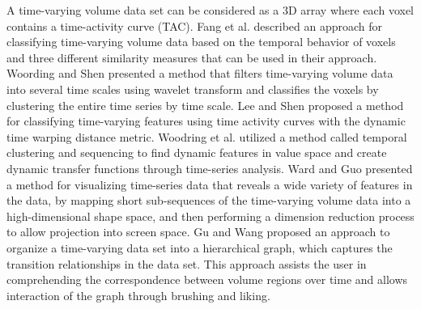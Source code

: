 A time-varying volume data set can be considered as a 3D array where each voxel contains a time-activity curve (TAC). Fang et al. \cite{fang_visualization_2007} described an approach for classifying time-varying volume data based on the temporal behavior of voxels and three different similarity measures that can be used in their approach.
Woording and Shen \cite{woodring_multiscale_2009} presented a method that filters time-varying volume data into several time scales using wavelet transform and classifies the voxels by clustering the entire time series by time scale.
Lee and Shen \cite{lee_visualizing_2009} proposed a method for classifying time-varying features using time activity curves with the dynamic time warping distance metric.
Woodring et al. \cite{woodring_semi-automatic_2009} utilized a method called temporal clustering and sequencing to find dynamic features in value space and create dynamic transfer functions through time-series analysis.
Ward and Guo \cite{ward_visual_2011} presented a method for visualizing time-series data that reveals a wide variety of features in the data, by mapping short sub-sequences of the time-varying volume data into a high-dimensional shape space, and then performing a dimension reduction process to allow projection into screen space.
Gu and Wang \cite{gu_transgraph:_2011} proposed an approach to organize a time-varying data set into a hierarchical graph, which captures the transition relationships in the data set. This approach assists the user in comprehending the correspondence between volume regions over time and allows interaction of the graph through brushing and liking.

